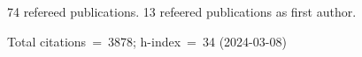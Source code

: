 74 refereed publications. 13 refeered publications as first author.

Total citations~=~3878; h-index~=~34 (2024-03-08)